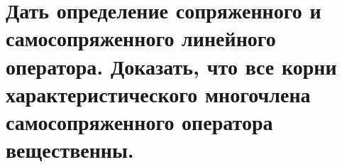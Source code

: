 \section{
    Дать определение сопряженного и самосопряженного линейного оператора. Доказать, что все корни характеристического многочлена самосопряженного оператора вещественны.
}




\newpage



